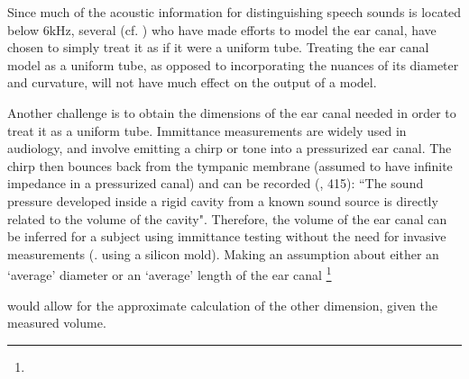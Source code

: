 \DIFaddend Since much of the acoustic information for distinguishing speech sounds is located below 6kHz, several (cf. \cite{stinson:89,hansen:97b,stenfelt:07}) who have made efforts to model the ear canal, have chosen to simply treat it as if it were a uniform tube.  Treating the ear canal model as a uniform tube, as opposed to incorporating the nuances of its diameter and curvature, will not have much effect on the output of a model.

Another challenge is to obtain the dimensions of the ear canal needed in order to treat it as a uniform tube\DIFdelbegin {}\DIFdelend . Immittance measurements are widely used in audiology, and involve emitting a chirp or tone into a pressurized ear canal.  The chirp then bounces back from the tympanic membrane (assumed to have infinite impedance in a pressurized canal) and can be recorded (\cite{ballachanda:97}, 415): ``The sound pressure developed inside a rigid cavity from a known sound source is directly related to the volume of the cavity".  Therefore, the volume of the ear canal can be inferred for a subject using immittance testing without the need for invasive measurements (\DIFdelbegin {}\DIFdelend \DIFaddbegin {}\DIFaddend . using a silicon mold).  Making an assumption about either an `average' diameter or an `average' length of the ear canal \DIFdelbegin \footnote{}  %
\addtocounter{footnote}{-1}%
\DIFdelend would allow for the approximate calculation of the other dimension, given the measured volume. \DIFaddbegin {}\DIFaddend %

